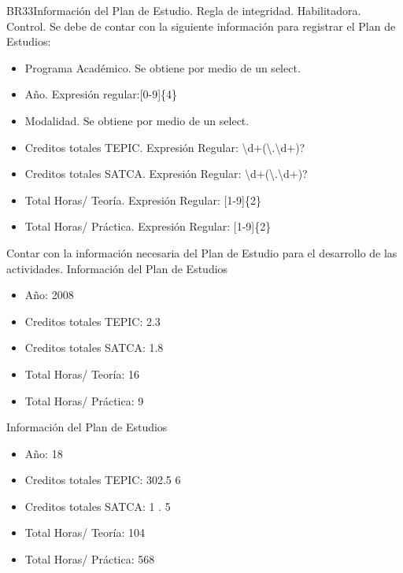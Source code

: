 \begin{BussinesRule}{BR33}{Información del Plan de Estudio.}
	\BRitem[Tipo:] Regla de integridad.
	\BRitem[Clase:] Habilitadora.
	\BRitem[Nivel:] Control.
	\BRitem[Descripción:]Se debe de contar con la siguiente información para registrar el Plan de Estudios:
	\begin{itemize}
		\item Programa Académico. Se obtiene por medio de un select.
		\item Año. Expresión regular:[0-9]\{4\}
		\item Modalidad. Se obtiene por medio de un select.
		\item Creditos totales TEPIC. Expresión Regular: \textbackslash d+(\textbackslash.\textbackslash d+)?
		\item Creditos totales SATCA. Expresión Regular: \textbackslash d+(\textbackslash.\textbackslash d+)?
		\item Total Horas/ Teoría. Expresión Regular: [1-9]\{2\}
		\item Total Horas/ Práctica. Expresión Regular: [1-9]\{2\}
	\end{itemize}
	\BRitem[Motivación:] Contar con la información necesaria del Plan de Estudio para el desarrollo de las actividades.
	 Información del Plan de Estudios
	\begin{itemize}
		\item Año: 2008
		\item Creditos totales TEPIC: 2.3
		\item Creditos totales SATCA: 1.8
		\item Total Horas/ Teoría: 16
		\item Total Horas/ Práctica: 9
	\end{itemize}
	 Información del Plan de Estudios
	\begin{itemize}
		\item Año: 18
		\item Creditos totales TEPIC: 302.5 6
		\item Creditos totales SATCA: 1 . 5
		\item Total Horas/ Teoría: 104
		\item Total Horas/ Práctica: 568
	\end{itemize}
\end{BussinesRule}

